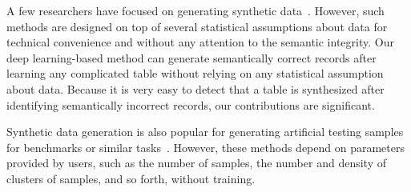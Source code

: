 A few researchers have focused on generating synthetic data~\cite{Aggarwal2004}. However, such methods are designed on top of several statistical assumptions about data for technical convenience and without any attention to the semantic integrity. Our deep learning-based method can generate semantically correct records after learning any complicated table without relying on any statistical assumption about data. Because it is very easy to detect that a table is synthesized after identifying semantically incorrect records, our contributions are significant.

Synthetic data generation is also popular for generating artificial testing samples for benchmarks or similar tasks~\cite{7796926}. However, these methods depend on parameters provided by users, such as the number of samples, the number and density of clusters of samples, and so forth, without training.


